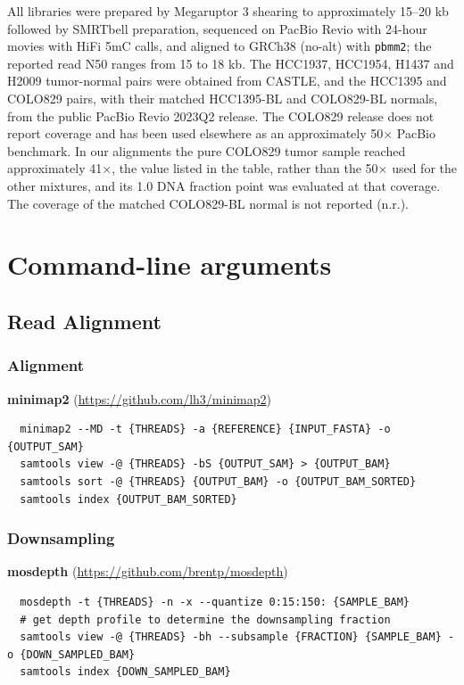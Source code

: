 \documentclass[pdflatex,sn-nature]{sn-jnl}
\begin{document}
\noindent All libraries were prepared by Megaruptor 3 shearing to approximately 15--20 kb followed by SMRTbell preparation, sequenced on PacBio Revio with 24-hour movies with HiFi 5mC calls, and aligned to GRCh38 (no-alt) with \texttt{pbmm2}; the reported read N50 ranges from 15 to 18 kb. The HCC1937, HCC1954, H1437 and H2009 tumor-normal pairs were obtained from CASTLE, and the HCC1395 and COLO829 pairs, with their matched HCC1395-BL and COLO829-BL normals, from the public PacBio Revio 2023Q2 release. The COLO829 release does not report coverage and has been used elsewhere as an approximately 50$\times$ PacBio benchmark. In our alignments the pure COLO829 tumor sample reached approximately 41$\times$, the value listed in the table, rather than the 50$\times$ used for the other mixtures, and its 1.0 DNA fraction point was evaluated at that coverage. The coverage of the matched COLO829-BL normal is not reported (n.r.).

\clearpage

\section{Command-line arguments}

\subsection{Read Alignment}
\subsubsection{Alignment}
\label{supp:alignment}
\textbf{minimap2} (\url{https://github.com/lh3/minimap2})
\begin{verbatim}
  minimap2 --MD -t {THREADS} -a {REFERENCE} {INPUT_FASTA} -o {OUTPUT_SAM}
  samtools view -@ {THREADS} -bS {OUTPUT_SAM} > {OUTPUT_BAM}
  samtools sort -@ {THREADS} {OUTPUT_BAM} -o {OUTPUT_BAM_SORTED}
  samtools index {OUTPUT_BAM_SORTED}
\end{verbatim}

\subsubsection{Downsampling}
\label{supp:downsampling}
\textbf{mosdepth} (\url{https://github.com/brentp/mosdepth})
\begin{verbatim}
  mosdepth -t {THREADS} -n -x --quantize 0:15:150: {SAMPLE_BAM}
  # get depth profile to determine the downsampling fraction
  samtools view -@ {THREADS} -bh --subsample {FRACTION} {SAMPLE_BAM} -o {DOWN_SAMPLED_BAM}
  samtools index {DOWN_SAMPLED_BAM}
\end{verbatim}
\end{document}
